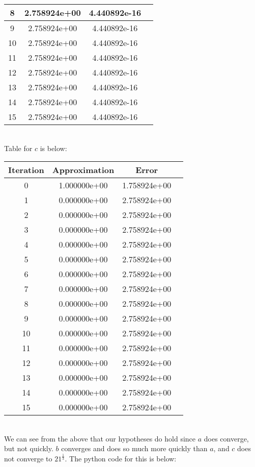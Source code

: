 \documentclass{article}
\begin{document}
\begin{enumerate}
\begin{tabular}{|c|c|c|c|}
\hline
8 & 2.758924e+00 & 4.440892e-16\\
\hline
9 & 2.758924e+00 & 4.440892e-16\\
\hline
10 & 2.758924e+00 & 4.440892e-16\\
\hline
11 & 2.758924e+00 & 4.440892e-16\\
\hline
12 & 2.758924e+00 & 4.440892e-16\\
\hline
13 & 2.758924e+00 & 4.440892e-16\\
\hline
14 & 2.758924e+00 & 4.440892e-16\\
\hline
15 & 2.758924e+00 & 4.440892e-16\\
\hline
\end{tabular}\\
Table for $c$ is below: \\
\begin{tabular}{|c|c|c|c|}
\hline
Iteration & Approximation & Error\\
\hline
0 & 1.000000e+00 & 1.758924e+00\\
\hline
1 & 0.000000e+00 & 2.758924e+00\\
\hline
2 & 0.000000e+00 & 2.758924e+00\\
\hline
3 & 0.000000e+00 & 2.758924e+00\\
\hline
4 & 0.000000e+00 & 2.758924e+00\\
\hline
5 & 0.000000e+00 & 2.758924e+00\\
\hline
6 & 0.000000e+00 & 2.758924e+00\\
\hline
7 & 0.000000e+00 & 2.758924e+00\\
\hline
8 & 0.000000e+00 & 2.758924e+00\\
\hline
9 & 0.000000e+00 & 2.758924e+00\\
\hline
10 & 0.000000e+00 & 2.758924e+00\\
\hline
11 & 0.000000e+00 & 2.758924e+00\\
\hline
12 & 0.000000e+00 & 2.758924e+00\\
\hline
13 & 0.000000e+00 & 2.758924e+00\\
\hline
14 & 0.000000e+00 & 2.758924e+00\\
\hline
15 & 0.000000e+00 & 2.758924e+00\\
\hline
\end{tabular}\\
We can see from the above that our hypotheses do hold since $a$ does converge, but not quickly. $b$ converges and does so much more quickly than $a$, and $c$ does not converge to $21^{\frac{1}{3}}$. The python code for this is below: \\

\end{enumerate}
\end{document}
